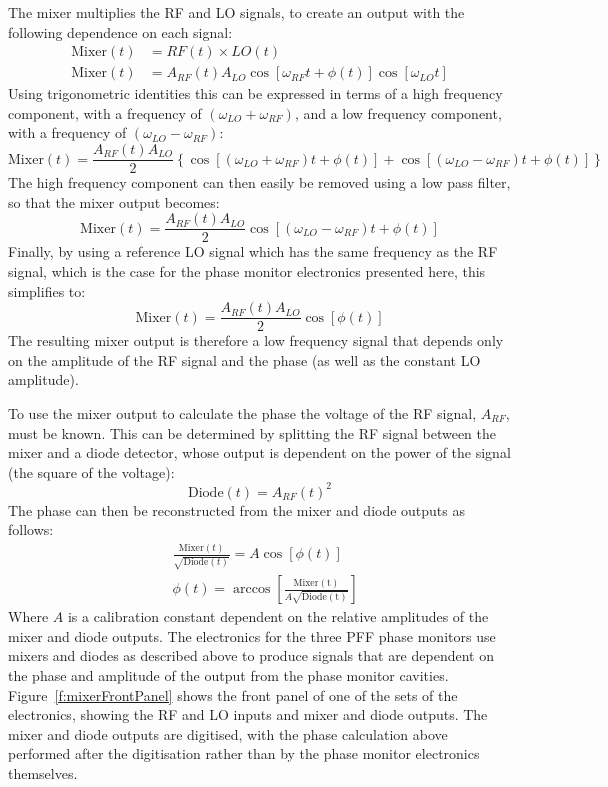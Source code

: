 The mixer multiplies the RF and LO signals, to create an output with the following dependence on each signal:
\begin{align}
\mathrm{Mixer}(t) &= RF(t) \times LO(t) \\
\mathrm{Mixer}(t) &= A_{RF}(t)A_{LO}\cos[\omega_{RF} t + \phi(t)]\cos[\omega_{LO} t]
\end{align}
Using trigonometric identities this can be expressed in terms of a high frequency component, with a frequency of \((\omega_{LO} + \omega_{RF})\), and a low frequency component, with a frequency of  \((\omega_{LO} - \omega_{RF})\):
\begin{equation}
\mathrm{Mixer}(t) = \frac{A_{RF}(t)A_{LO}}{2}\left\lbrace\cos[(\omega_{LO} + \omega_{RF})t + \phi(t)] + \cos[(\omega_{LO} - \omega_{RF})t + \phi(t)]\right\rbrace
\end{equation}
The high frequency component can then easily be removed using a low pass filter, so that the mixer output becomes:
\begin{equation}
\mathrm{Mixer}(t) = \frac{A_{RF}(t)A_{LO}}{2}\cos[(\omega_{LO} - \omega_{RF})t + \phi(t)]
\label{e:mixOutAnyFreq} 
\end{equation}
Finally, by using a reference LO signal which has the same frequency as the RF signal, which is the case for the phase monitor electronics presented here, this simplifies to:
\begin{equation}
\mathrm{Mixer}(t) = \frac{A_{RF}(t)A_{LO}}{2}\cos[\phi(t)]
\label{e:mixOutSameFreq} 
\end{equation}
The resulting mixer output is therefore a low frequency signal that depends only on the amplitude of the RF signal and the phase (as well as the constant LO amplitude).

To use the mixer output to calculate the phase the voltage of the RF signal, \(A_{RF}\), must  be known. This can be determined by splitting the RF signal between the mixer and a diode detector, whose output is dependent on the power of the signal (the square of the voltage):
\begin{equation}
\mathrm{Diode}(t) = A_{RF}(t)^2
\label{e:idealDiode}
\end{equation}
The phase can then be reconstructed from the mixer and diode outputs as follows:
\begin{align}
&\frac{\mathrm{Mixer}(t)}{\sqrt{\mathrm{Diode}(t)}} = A\cos[\phi(t)] \label{e:mixOverSqrtDio} \\
&\phi(t) = \arccos\left[\frac{\mathrm{Mixer(t)}}{A\sqrt{\mathrm{Diode(t)}}}\right]
\label{e:phaseRecIdeal} 
\end{align}
Where \(A\) is a calibration constant dependent on the relative amplitudes of the mixer and diode outputs. The electronics for the three PFF phase monitors use mixers and diodes as described above to produce signals that are dependent on the phase and amplitude of the output from the phase monitor cavities. Figure~\ref{f:mixerFrontPanel} shows the front panel of one of the sets of the electronics, showing the RF and LO inputs and mixer and diode outputs. The mixer and diode outputs are digitised, with the phase calculation above performed after the digitisation rather than by the phase monitor electronics themselves. 

